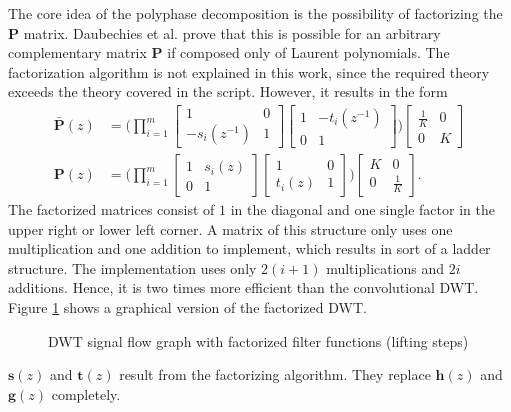 \begin{refsection}
The core idea of the polyphase decomposition is the possibility of factorizing the $\bm P$ matrix.
Daubechies et al. prove that this is possible for an arbitrary complementary matrix $\bm P$ if composed only of Laurent polynomials.
The factorization algorithm is not explained in this work, since the required theory exceeds the theory covered in the script.
However, it results in the form
\begin{align}
	\bm{\bar P}(z) &=
	\Biggl(
	\prod_{i=1}^{m}
	\begin{bmatrix}
		1 & 0 \\
		-s_i(z^{-1}) & 1
	\end{bmatrix}
	\begin{bmatrix}
		1 & -t_i(z^{-1}) \\
		0 & 1
	\end{bmatrix}
	\Biggr)
	\begin{bmatrix}
		\frac{1}{K} & 0 \\
		0 & K
	\end{bmatrix}
	\\
	\bm P(z) &=
	\Biggl(
	\prod_{i=1}^{m}
	\begin{bmatrix}
		1 & s_i(z) \\
		0 & 1
	\end{bmatrix}
	\begin{bmatrix}
		1 & 0 \\
		t_i(z) & 1
	\end{bmatrix}
	\Biggr)
	\begin{bmatrix}
		K & 0 \\
		0 & \frac{1}{K}
	\end{bmatrix}
	.
\end{align}
The factorized matrices consist of $1$ in the diagonal and one single factor in the upper right or lower left corner.
A matrix of this structure only uses one multiplication and one addition to implement, which results in sort of a ladder structure.
The implementation uses only $2(i+1)$ multiplications and $2i$ additions.
Hence, it is two times more efficient than the convolutional DWT.
Figure \ref{fpga:fig:liftingStepFactorization} shows a graphical version of the factorized DWT.
\begin{figure}
	\centering
	
	
	\caption{DWT signal flow graph with factorized filter functions (lifting steps)}
	\label{fpga:fig:liftingStepFactorization}
\end{figure}
$\bm s(z)$ and $\bm t(z)$ result from the factorizing algorithm.
They replace $\bm h(z)$ and $\bm g(z)$ completely.


\end{refsection}
